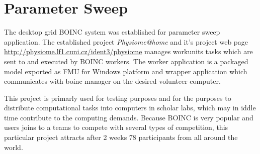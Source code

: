 \section{Parameter Sweep}
\label{sec:resultsboinc}
The desktop grid BOINC system was established for parameter sweep application. The established project \emph{Physiome@home} and it's project web page \url{http://physiome.lf1.cuni.cz/ident3/physiome} manages workunits tasks which are sent to and executed by BOINC workers. The worker application is a packaged model exported as FMU for Windows platform and wrapper application which communicates with boinc manager on the desired volunteer computer. 

This project is primarly used for testing purposes and for the purposes to distribute computational tasks into computers in scholar labs, which may in iddle time contribute to the computing demands. Because BOINC is very popular and users joins to a teams to compete with several types of competition, this particular project attracts after 2 weeks 78 participants from all around the world. 

%

